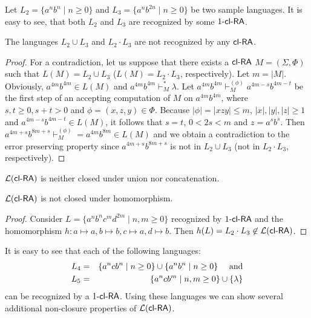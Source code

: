 Let $L_2 = \{a^nb^n \mid n\ge 0\}$ and $L_3 = \{a^nb^{2n} \mid n \ge 0\}$ be two sample languages. It is easy to see, that both $L_2$ and $L_3$ are recognized by some $\kclRA[1]$.

\begin{theorem}\label{theorem:L_2_L_3}
The languages $L_2 \cup L_3$ and $L_2 \cdot L_3$ are not recognized by any $\clRA$.
\end{theorem}

\begin{proof}
For a contradiction, let us suppose that there exists a $\clRA$ $M = (\Sigma,\Phi)$ such that $L(M) = L_2 \cup L_3$ ($L(M) = L_2 \cdot L_3$, respectively). Let $m = |M|$. Obviously, $a^{4m} b^{4m} \in L(M)$ and $a^{4m} b^{4m} \vdash_M^* \lambda$. Let $a^{4m} b^{4m} \vdash_M^{(\phi)} a^{4m-s} b^{4m-t}$ be the first step of an accepting computation of $M$ on $a^{4m} b^{4m}$, where $s, t \ge 0, s+t > 0$ and $\phi = (x, z, y) \in \Phi$. Because $|\phi| = |xzy| \le m$, $|x|, |y|, |z| \ge 1$ and $a^{4m-s} b^{4m-t} \in L(M)$, it follows that $s = t$, $0 < 2s < m$ and $z = a^sb^s$. Then $a^{4m+s} b^{8m+s} \vdash_M^{(\phi)} = a^{4m} b^{8m} \in L(M)$ and we obtain a contradiction to the error preserving property since $a^{4m+s} b^{8m+s}$ is not in $L_2 \cup L_3$ (not in $L_2 \cdot L_3$, respectively).
\end{proof}

\begin{corollary}
$\calL{\clRA}$ is neither closed under union nor concatenation.
\end{corollary}

\begin{corollary}
$\calL{\clRA}$ is not closed under homomorphism.
\end{corollary}

\begin{proof}
Consider $L = \{ a^n b^n c^m d^{2m} \mid n, m \ge 0 \}$ recognized by $\kclRA[1]$ and the homomorphism $h: a \mapsto a, b \mapsto b, c \mapsto a, d \mapsto b$. Then $h(L) = L_2 \cdot L_3 \not\in \calL{\clRA}$.
\end{proof}

It is easy to see that each of the following languages:
    \begin{eqnarray*}
        L_4 & = & \{a^ncb^n \mid n \ge 0\} \cup \{a^nb^n \mid n \ge 0\}\quad \textup{ and} \\
        L_5 & = & \{a^ncb^m \mid n, m \ge 0\} \cup \{\lambda\}
    \end{eqnarray*}
can be recognized by a $\kclRA[1]$. Using these languages we can show several additional non-closure properties of $\calL{\clRA}$.

